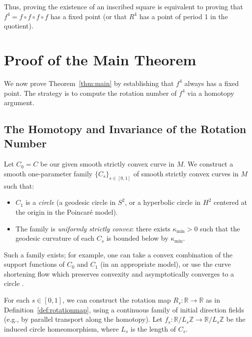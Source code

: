 \documentclass{article}
\begin{document}
Thus, proving the existence of an inscribed square is equivalent to proving that $f^4 = f \circ f \circ f \circ f$ has a fixed point (or that $R^4$ has a point of period 1 in the quotient).

\section{Proof of the Main Theorem}

We now prove Theorem~\ref{thm:main} by establishing that $f^4$ always has a fixed point. The strategy is to compute the rotation number of $f^4$ via a homotopy argument.

\subsection{The Homotopy and Invariance of the Rotation Number}

Let $C_0 = C$ be our given smooth strictly convex curve in $M$. We construct a smooth one-parameter family $\{C_s\}_{s \in [0,1]}$ of smooth strictly convex curves in $M$ such that:
\begin{itemize}
    \item $C_1$ is a \emph{circle} (a geodesic circle in $S^2$, or a hyperbolic circle in $H^2$ centered at the origin in the Poincaré model).
    \item The family is \emph{uniformly strictly convex}: there exists $\kappa_{\min} > 0$ such that the geodesic curvature of each $C_s$ is bounded below by $\kappa_{\min}$.
\end{itemize}
Such a family exists; for example, one can take a convex combination of the support functions of $C_0$ and $C_1$ (in an appropriate model), or use the curve shortening flow which preserves convexity and asymptotically converges to a circle \cite{Gage1984}.

For each $s \in [0,1]$, we can construct the rotation map $R_s: \mathbb{R} \to \mathbb{R}$ as in Definition~\ref{def:rotationmap}, using a continuous family of initial direction fields (e.g., by parallel transport along the homotopy). Let $f_s: \mathbb{R}/L_s\mathbb{Z} \to \mathbb{R}/L_s\mathbb{Z}$ be the induced circle homeomorphism, where $L_s$ is the length of $C_s$.
\end{document}
